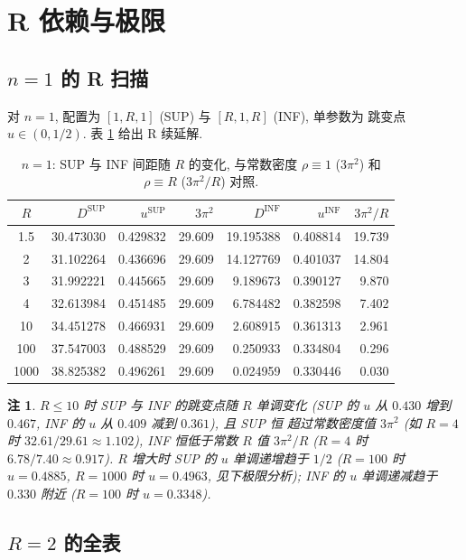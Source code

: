 \documentclass[UTF8]{ctexart}
\newtheorem{remark}[theorem]{注}
\begin{document}
\section{R 依赖与极限}\label{sec:rscan}

\subsection{\texorpdfstring{$n=1$}{n=1} 的 R 扫描}

对 $n=1$, 配置为 $[1, R, 1]$ (SUP) 与 $[R, 1, R]$ (INF), 单参数为
跳变点 $u \in (0, 1/2)$. 表 \ref{tab:rscan} 给出 R 续延解.

\begin{table}[ht]
\centering
\caption{$n=1$: SUP 与 INF 间距随 $R$ 的变化, 与常数密度 $\rho\equiv1$
($3\pi^2$) 和 $\rho\equiv R$ ($3\pi^2/R$) 对照.}
\label{tab:rscan}
\begin{tabular}{c|rrr|rrr}
	$R$ & $D^{\mathrm{SUP}}$ & $u^{\mathrm{SUP}}$ & $3\pi^2$ &
	$D^{\mathrm{INF}}$ & $u^{\mathrm{INF}}$ & $3\pi^2/R$ \\\hline
1.5 & 30.473030 & 0.429832 & 29.609 & 19.195388 & 0.408814 & 19.739\\
2 & 31.102264 & 0.436696 & 29.609 & 14.127769 & 0.401037 & 14.804\\
3 & 31.992221 & 0.445665 & 29.609 & 9.189673 & 0.390127 & 9.870\\
4 & 32.613984 & 0.451485 & 29.609 & 6.784482 & 0.382598 & 7.402\\
10 & 34.451278 & 0.466931 & 29.609 & 2.608915 & 0.361313 & 2.961\\
100 & 37.547003 & 0.488529 & 29.609 & 0.250933 & 0.334804 & 0.296\\
1000 & 38.825382 & 0.496261 & 29.609 & 0.024959 & 0.330446 & 0.030\\
\end{tabular}
\end{table}

\begin{remark}
	$R \leq 10$ 时 SUP 与 INF 的跳变点随 $R$ 单调变化 (SUP 的 $u$ 从 $0.430$ 增到 $0.467$, INF 的 $u$ 从 $0.409$ 减到 $0.361$), 且 SUP 恒
	超过常数密度值 $3\pi^2$ (如 $R=4$ 时 $32.61/29.61 \approx 1.102$),
	INF 恒低于常数 $R$ 值 $3\pi^2/R$ ($R=4$ 时 $6.78/7.40 \approx 0.917$).
	$R$ 增大时 SUP 的 $u$ 单调递增趋于 $1/2$ ($R=100$ 时 $u = 0.4885$,
	$R=1000$ 时 $u = 0.4963$, 见下极限分析); INF 的 $u$ 单调递减趋于
	$0.330$ 附近 ($R=100$ 时 $u = 0.3348$).
\end{remark}

\subsection{\texorpdfstring{$R=2$}{R=2} 的全表}
\end{document}
